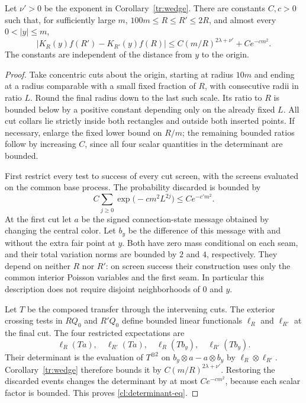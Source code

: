 \begin{lemma}\label{cl:determinant}
Let $\nu'>0$ be the exponent in Corollary~\ref{tr:wedge}.
There are constants $C,c>0$ such that, for sufficiently large $m$,
$100m\le R\le R'\le2R$, and almost every $0<|y|\le m$,
\begin{equation}\label{cl:determinant-eq}
 \bigl|K_R(y)f(R')-K_{R'}(y)f(R)\bigr|
 \le C(m/R)^{2\lambda+\nu'}+Ce^{-cm^2}.
\end{equation}
The constants are independent of the distance from $y$ to the origin.
\end{lemma}

\begin{proof}
Take concentric cuts about the origin, starting at radius $10m$
and ending at a radius comparable with a small fixed fraction of
$R$, with consecutive radii in ratio $L$. Round the final radius
down to the last such scale. Its ratio to $R$ is bounded below
by a positive constant depending only on the already fixed $L$.
All cut collars lie strictly inside both rectangles and outside
both inserted points. If necessary, enlarge the fixed lower
bound on $R/m$; the remaining bounded ratios follow by increasing
$C$, since all four scalar quantities in the determinant are bounded.

First restrict every test to success of every cut screen, with
the screens evaluated on the common base process. The probability
discarded is bounded by
\[
 C\sum_{j\ge0}\exp\bigl(-cm^2L^{2j}\bigr)
 \le Ce^{-c'm^2}.
\]
At the first cut let $a$ be the signed connection-state message
obtained by changing the central color. Let $b_y$ be the
difference of this message with and without the extra fair point
at $y$. Both have zero mass conditional on each seam, and
their total variation norms are bounded by $2$ and $4$,
respectively. They depend on neither $R$ nor $R'$: on screen
success their construction uses only the common interior
Poisson variables and the first seam. In particular this
description does not require disjoint neighborhoods of $0$ and $y$.

Let $T$ be the composed transfer through the intervening cuts.
The exterior crossing tests in $RQ_0$ and $R'Q_0$ define bounded
linear functionals $\ell_R$ and $\ell_{R'}$ at the final cut.
The four restricted expectations are
\[
 \ell_R(Ta),\quad \ell_{R'}(Ta),\quad
 \ell_R(Tb_y),\quad \ell_{R'}(Tb_y).
\]
Their determinant is the evaluation of $T^{\otimes2}$ on
$b_y\otimes a-a\otimes b_y$ by
$\ell_R\otimes\ell_{R'}$. Corollary~\ref{tr:wedge} therefore
bounds it by $C(m/R)^{2\lambda+\nu'}$.
Restoring the discarded events changes the determinant by at
most $Ce^{-cm^2}$, because each scalar factor is bounded.
This proves \eqref{cl:determinant-eq}.
\end{proof}

